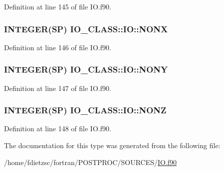 Definition at line 145 of file IO.f90.

\hypertarget{typeIO__CLASS_1_1IO_a3fe805b71504c0d8d043bb0bc22b9ec1}{
\subsubsection[{NONX}]{\setlength{\rightskip}{0pt plus 5cm}INTEGER(SP) {\bf IO\_\-CLASS::IO::NONX}}}
\label{typeIO__CLASS_1_1IO_a3fe805b71504c0d8d043bb0bc22b9ec1}


Definition at line 146 of file IO.f90.

\hypertarget{typeIO__CLASS_1_1IO_a1259b785f9bba0ff1f11191b9f8a3b8d}{
\subsubsection[{NONY}]{\setlength{\rightskip}{0pt plus 5cm}INTEGER(SP) {\bf IO\_\-CLASS::IO::NONY}}}
\label{typeIO__CLASS_1_1IO_a1259b785f9bba0ff1f11191b9f8a3b8d}


Definition at line 147 of file IO.f90.

\hypertarget{typeIO__CLASS_1_1IO_ad396a56353638ec204e9fff5ae71202c}{
\subsubsection[{NONZ}]{\setlength{\rightskip}{0pt plus 5cm}INTEGER(SP) {\bf IO\_\-CLASS::IO::NONZ}}}
\label{typeIO__CLASS_1_1IO_ad396a56353638ec204e9fff5ae71202c}


Definition at line 148 of file IO.f90.



The documentation for this type was generated from the following file:\begin{DoxyCompactItemize}
\item 
/home/fdietzsc/fortran/POSTPROC/SOURCES/\hyperlink{IO_8f90}{IO.f90}\end{DoxyCompactItemize}
